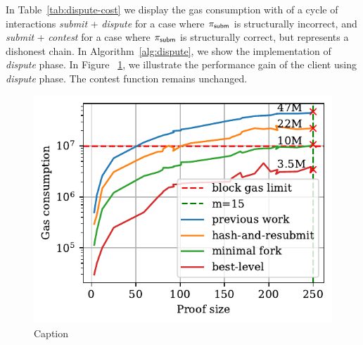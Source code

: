 In Table~\ref{tab:dispute-cost} we display the gas consumption with of
a cycle of interactions \emph{submit} + \emph{dispute} for a case where $\mathsf{\pi_{subm}}$
is structurally incorrect, and \emph{submit} + \emph{contest} for a case where
$\mathsf{\pi_{subm}}$ is structurally correct, but represents a dishonest chain. In
Algorithm~\ref{alg:dispute}, we show the implementation of \emph{dispute}
phase. In Figure ~\ref{fig:dispute}, we illustrate the performance gain of the
client using \emph{dispute} phase. The \textsf{contest} function remains
unchanged.





\begin{figure}[!h]
    \begin{center}
        \includegraphics[width=1\columnwidth]{figures/dispute.pdf}
    \end{center}
    \caption{Caption}
    \label{fig:dispute}
\end{figure}
